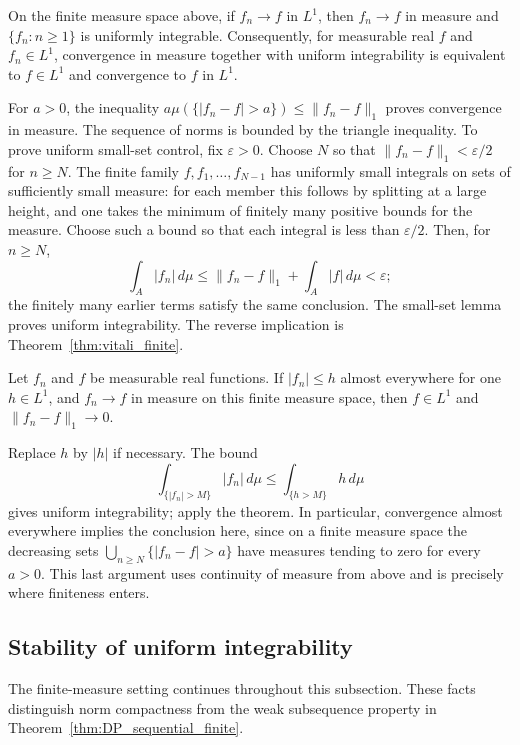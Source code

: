 \begin{proposition}
On the finite measure space above, if $f_n\to f$ in $L^1$, then
$f_n\to f$ in measure and $\{f_n:n\geqslant1\}$ is uniformly integrable.
Consequently, for measurable real $f$ and $f_n\in L^1$, convergence
in measure together with uniform integrability is equivalent to
$f\in L^1$ and convergence to $f$ in $L^1$.
\end{proposition}
\Proof
For $a>0$, the inequality
$a\mu(\{|f_n-f|>a\})\leqslant\|f_n-f\|_1$ proves convergence
in measure. The sequence of norms is bounded by the triangle inequality.
To prove uniform small-set control, fix $\varepsilon>0$. Choose $N$
so that $\|f_n-f\|_1<\varepsilon/2$ for $n\geqslant N$.
The finite family $f,f_1,\ldots,f_{N-1}$ has uniformly small integrals
on sets of sufficiently small measure: for each member this follows
by splitting at a large height, and one takes the minimum of finitely
many positive bounds for the measure. Choose such a bound so that
each integral is less than $\varepsilon/2$. Then, for $n\geqslant N$,
\[
\int_A|f_n|\,d\mu\leqslant\|f_n-f\|_1+\int_A|f|\,d\mu
<\varepsilon;
\]
the finitely many earlier terms satisfy the same conclusion.
The small-set lemma proves uniform integrability. The reverse
implication is Theorem~\ref{thm:vitali_finite}.
\Done

\begin{corollary}
Let $f_n$ and $f$ be measurable real functions. If
$|f_n|\leqslant h$ almost everywhere for one $h\in L^1$, and
$f_n\to f$ in measure on this finite measure space, then
$f\in L^1$ and $\|f_n-f\|_1\to0$.
\end{corollary}
\Proof
Replace $h$ by $|h|$ if necessary. The bound
\[
\int_{\{|f_n|>M\}}|f_n|\,d\mu
\leqslant\int_{\{h>M\}}h\,d\mu
\]
gives uniform integrability; apply the theorem. In particular,
convergence almost everywhere implies the conclusion here, since
on a finite measure space the decreasing sets
$\bigcup_{n\geqslant N}\{|f_n-f|>a\}$ have measures tending to zero
for every $a>0$. This last argument uses continuity of measure from
above and is precisely where finiteness enters.
\Done

\subsection{Stability of uniform integrability}
The finite-measure setting continues throughout this subsection. These
facts distinguish norm compactness from the weak subsequence property
in Theorem~\ref{thm:DP_sequential_finite}.

